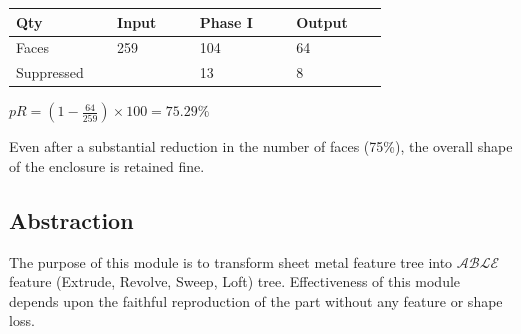 \begin{minipage}[c]{0.6\linewidth}
\begin{tabular}[h]{@{} p{0.22\linewidth} p{0.18\linewidth} p{0.21\linewidth} p{0.2\linewidth} @{}}\toprule
\textbf{Qty} & \textbf{Input} & \textbf{Phase I} & \textbf{Output}\\  \midrule
Faces  & 259 & 104 & 64\\
Suppressed  &  &13 & 8\\
\bottomrule
\end{tabular}
\end{minipage}
\begin{minipage}[c]{0.38\linewidth}
$pR = (1 - \frac{64}{259}) \times 100 = 75.29\%$
\end{minipage}

Even after a substantial reduction in the number of faces (75\%), the overall shape of the enclosure is retained fine.

\subsection{Abstraction}

The purpose of this module is to transform sheet metal feature tree into  $\mathcal{ABLE}$ feature (Extrude, Revolve, Sweep, Loft) tree. Effectiveness of this module depends upon the faithful reproduction of the part without any feature or shape loss.

